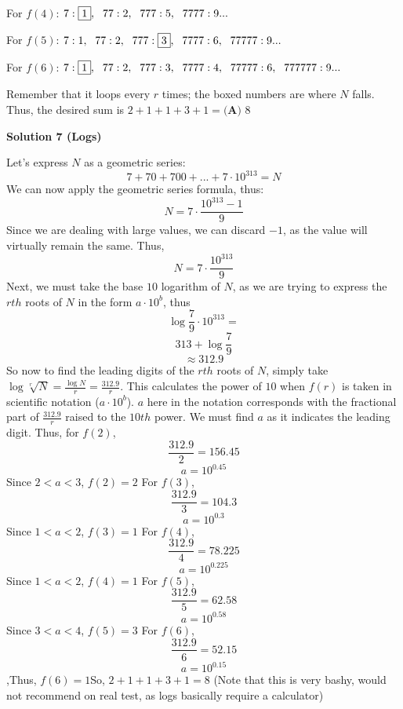 \begin{enumerate}
 


 For $f(4)$: $7: \boxed{1},\hspace{0.085in} 77: 2,\hspace{0.085in} 777: 5,\hspace{0.085in} 7777: 9 ...$

 For $f(5)$: $7: 1,\hspace{0.085in} 77: 2,\hspace{0.085in} 777: \boxed{3},\hspace{0.085in} 7777: 6,\hspace{0.085in} 77777: 9 ...$

 For $f(6)$: $7: \boxed{1},\hspace{0.085in} 77: 2,\hspace{0.085in} 777: 3,\hspace{0.085in} 7777: 4,\hspace{0.085in} 77777: 6,\hspace{0.085in} 777777: 9 ...$

 Remember that it loops every $r$ times; the boxed numbers are where $N$ falls. Thus, the desired sum is $2+1+1+3+1 = \boxed{\textbf{(A) }8}$




\textbf{Solution 7 (Logs)}

Let's express $N$ as a geometric series:
 \[7+70+700+...+7 \cdot 10^{313}=N\]We can now apply the geometric series formula, thus:
 \[N=7 \cdot \frac{10^{313}-1}{9}\]Since we are dealing with large values, we can discard $-1$, as the value will virtually remain the same. Thus, 
 \[N=7 \cdot \frac{10^{313}}{9}\]Next, we must take the base $10$ logarithm of $N$, as we are trying to express the $rth$ roots of $N$ in the form $a \cdot 10^b$, thus 
 \[\log{\frac{7}{9} \cdot 10^{313}}=\]
 \[313 + \log{\frac{7}{9}}\]
 \[\approx 312.9\]So now to find the leading digits of the $rth$ roots of $N$, simply take $\log{\sqrt[r]{N}}=\frac{\log{N}}{r}=\frac{312.9}{r}$. This calculates the power of $10$ when $f(r)$ is taken in scientific notation ($a \cdot 10^b$). $a$ here in the notation corresponds with the fractional part of $\frac{312.9}{r}$ raised to the $10th$ power. We must find $a$ as it indicates the leading digit. Thus, for $f(2)$, 
 \[\frac{312.9}{2} = 156.45\]
 \[a=10^{0.45}\]Since $2<a<3$, $f(2)=2$ 
For $f(3)$, 
 \[\frac{312.9}{3} = 104.3\]
 \[a=10^{0.3}\]Since $1<a<2$, $f(3)=1$ 
For $f(4)$,
 \[\frac{312.9}{4} = 78.225\]
 \[a=10^{0.225}\]Since $1<a<2$, $f(4)=1$ 
For $f(5)$, 
 \[\frac{312.9}{5}=62.58\]
 \[a=10^{0.58}\]Since $3<a<4$, $f(5)=3$ 
For $f(6)$,
 \[\frac{312.9}{6}=52.15\]
 \[a=10^{0.15}\],Thus, $f(6)=1$So, $2+1+1+3+1=\boxed{8}$ 
(Note that this is very bashy, would not recommend on real test, as logs basically require a calculator)


\end{enumerate}
